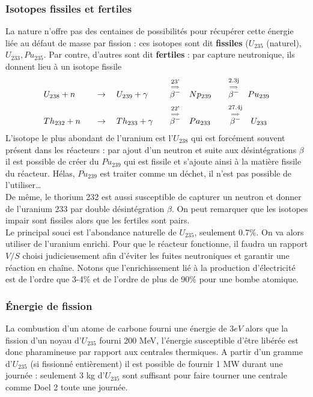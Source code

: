 \subsubsection{Isotopes fissiles et fertiles}
La nature n'offre pas des centaines de possibilités pour récupérer cette énergie liée au 
défaut de masse par fission : ces isotopes sont dit \textbf{fissiles} ($U_{235}$ (naturel), 
$U_{233}, Pu_{235}$. Par contre, d'autres sont dit \textbf{fertiles} : par capture neutronique, 
ils donnent lieu à un isotope fissile
\begin{equation}
\begin{array}{llll}
U_{238} + n\quad&\to\quad U_{239}+\gamma\quad&\overset{\underset{\Longrightarrow}{\text{23'}}}{\beta^-}\quad Np_{239}\quad&\overset{\underset{\Longrightarrow}{\text{2.3j}}}{\beta^-}\quad Pu_{239}
\vspace{2mm}\\
Th_{232} + n\quad&\to\quad Th_{233}+\gamma\quad&\overset{\underset{\Longrightarrow}{\text{22'}}}{\beta^-}\quad Pa_{233}\quad&\overset{\underset{\Longrightarrow}{\text{27.4j}}}{\beta^-}\quad U_{233}
\end{array}
\end{equation}
L'isotope le plus abondant de l'uranium est l'$U_{238}$ qui est forcément souvent présent dans 
les réacteurs : par ajout d'un neutron  et suite aux désintégrations $\beta$ il est possible de
créer du $Pu_{239}$ qui est fissile et s'ajoute ainsi à la matière fissile du réacteur. Hélas, 
$Pu_{239}$ est traiter comme un déchet, il n'est pas possible de l'utiliser\dots\\

De même, le thorium 232 est aussi susceptible de capturer un neutron et donner de l'uranium 233 par 
double désintégration $\beta$. On peut remarquer que les isotopes impair sont fissiles alors que les
fertiles sont pairs.\\

Le principal souci est l'abondance naturelle de $U_{235}$, seulement 0.7\%. On va alors utiliser 
de l'uranium enrichi. Pour que le réacteur fonctionne, il faudra un rapport $V/S$ choisi judicieusement afin d'éviter les fuites neutroniques et garantir une réaction en chaîne. Notons 
que l'enrichissement lié à la production d'électricité est de l'ordre que 3-4\% et de l'ordre de
plus de 90\% pour une bombe atomique.

\subsubsection{Énergie de fission}
La combustion d'un atome de carbone fourni une énergie de $3eV$ alors que la fission d'un noyau 
d'$U_{235}$ fourni 200 MeV, l'énergie susceptible d'être libérée est donc pharamineuse par rapport 
aux centrales thermiques. A partir d'un gramme d'$U_{235}$ (si fissionné entièrement) il est possible 
de fournir  1 MW durant une journée : seulement 3 kg d'$U_{235}$ sont suffisant pour faire tourner 
une centrale comme Doel 2 toute une journée.\\

